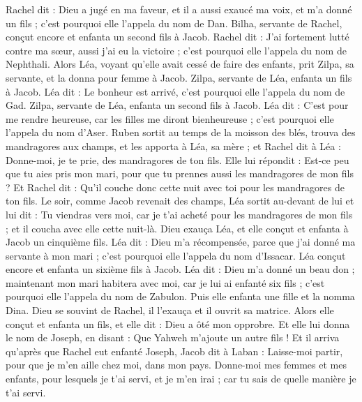 \begin{multicols}{2}
Rachel dit : Dieu a jugé en ma faveur, et il a aussi exaucé ma voix, et m'a donné un fils ; c'est pourquoi elle l'appela du nom de Dan.
Bilha, servante de Rachel, conçut encore et enfanta un second fils à Jacob.
Rachel dit : J'ai fortement lutté contre ma sœur, aussi j'ai eu la victoire ; c'est pourquoi elle l'appela du nom de Nephthali.
Alors Léa, voyant qu'elle avait cessé de faire des enfants, prit Zilpa, sa servante, et la donna pour femme à Jacob.
Zilpa, servante de Léa, enfanta un fils à Jacob.
Léa dit : Le bonheur est arrivé, c'est pourquoi elle l'appela du nom de Gad.
Zilpa, servante de Léa, enfanta un second fils à Jacob.
Léa dit : C'est pour me rendre heureuse, car les filles me diront bienheureuse ; c'est pourquoi elle l'appela du nom d'Aser.
Ruben sortit au temps de la moisson des blés, trouva des mandragores aux champs, et les apporta à Léa, sa mère ; et Rachel dit à Léa : Donne-moi, je te prie, des mandragores de ton fils.
Elle lui répondit : Est-ce peu que tu aies pris mon mari, pour que tu prennes aussi les mandragores de mon fils ? Et Rachel dit : Qu'il couche donc cette nuit avec toi pour les mandragores de ton fils.
Le soir, comme Jacob revenait des champs, Léa sortit au-devant de lui et lui dit : Tu viendras vers moi, car je t'ai acheté pour les mandragores de mon fils ; et il coucha avec elle cette nuit-là.
Dieu exauça Léa, et elle conçut et enfanta à Jacob un cinquième fils.
Léa dit : Dieu m'a récompensée, parce que j'ai donné ma servante à mon mari ; c'est pourquoi elle l'appela du nom d'Issacar.
Léa conçut encore et enfanta un sixième fils à Jacob.
Léa dit : Dieu m'a donné un beau don ; maintenant mon mari habitera avec moi, car je lui ai enfanté six fils ; c'est pourquoi elle l'appela du nom de Zabulon.
Puis elle enfanta une fille et la nomma Dina.
Dieu se souvint de Rachel, il l'exauça et il ouvrit sa matrice.
Alors elle conçut et enfanta un fils, et elle dit : Dieu a ôté mon opprobre.
Et elle lui donna le nom de Joseph, en disant : Que Yahweh m'ajoute un autre fils !
Et il arriva qu'après que Rachel eut enfanté Joseph, Jacob dit à Laban : Laisse-moi partir, pour que je m'en aille chez moi, dans mon pays.
Donne-moi mes femmes et mes enfants, pour lesquels je t'ai servi, et je m'en irai ; car tu sais de quelle manière je t'ai servi.

\end{multicols}
